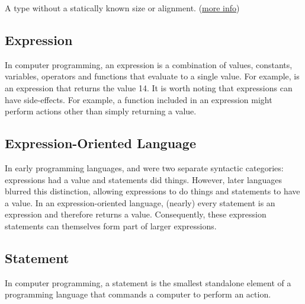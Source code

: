 A type without a statically known size or alignment. (\href{https://doc.rust-lang.org/nomicon/exotic-sizes.html#dynamically-sized-types-dsts}{more info})

\subsection*{Expression}
\label{sec:gloss_expression}

In computer programming, an expression is a combination of values, constants, variables, operators and functions that 
evaluate to a single value. For example,  is an expression that returns the value 14. It is worth 
noting that expressions can have side-effects. For example, a function included in an expression might perform actions 
other than simply returning a value.

\subsection*{Expression-Oriented Language}
\label{sec:gloss_expressionorientedlang}

In early programming languages,  and  were two separate syntactic categories: 
expressions had a value and statements did things. However, later languages blurred this distinction, allowing expressions to do things 
and statements to have a value. In an expression-oriented language, (nearly) every statement is an expression and therefore returns a value.
 Consequently, these expression statements can themselves form part of larger expressions.

\subsection*{Statement}
\label{sec:gloss_statements}

In computer programming, a statement is the smallest standalone element of a programming language that commands a computer to perform 
an action.